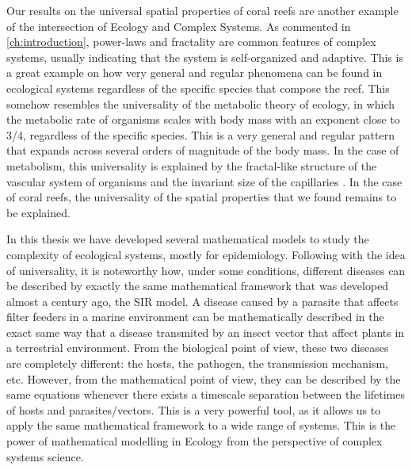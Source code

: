 Our results on the universal spatial properties of coral reefs are another
example of the intersection of Ecology and Complex Systems. As commented in
\cref{ch:introduction}, power-laws and fractality are common features of
complex systems, usually indicating that the system is self-organized and
adaptive. This is a great example on how very general and regular phenomena can
be found in ecological systems regardless of the specific species that compose
the reef. This somehow resembles the universality of the metabolic theory of
ecology, in which the metabolic rate of organisms scales with body mass with
an exponent close to 3/4, regardless of the specific species. This is a very
general and regular pattern that expands across several orders of magnitude
of the body mass. In the case of metabolism, this universality is explained by
the fractal-like structure of the vascular system of organisms and the
invariant size of the capillaries \cite{West1997}. In the case of coral reefs,
the universality of the spatial properties that we found remains to be
explained.


In this thesis we have developed several mathematical models to study the
complexity of ecological systems, mostly for epidemiology. Following with the
idea of universality, it is noteworthy how, under some conditions, different
diseases can be described by exactly the same mathematical framework that was
developed almost a century ago, the SIR model. A disease caused by a parasite
that affects filter feeders in a marine environment can be mathematically
described in the exact same way that a disease transmited by an insect vector
that affect plants in a terrestrial environment. From the biological point of
view, these two diseases are completely different: the hosts, the pathogen, the
transmission mechanism, etc. However, from the mathematical point of view, they
can be described by the same equations whenever there exists a timescale
separation between the lifetimes of hosts and parasites/vectors. This is a very
powerful tool, as it allows us to apply the same mathematical framework to a
wide range of systems. This is the power of mathematical modelling in Ecology
from the perspective of complex systems science.

